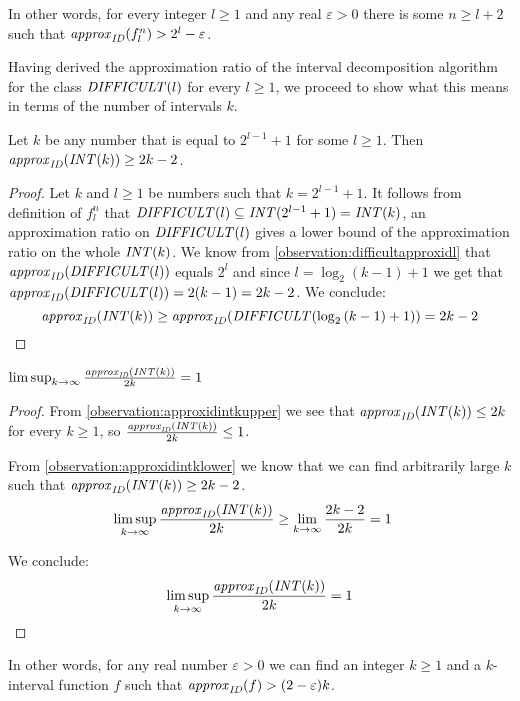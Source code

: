 In other words,
for every integer $l \geq 1$
and any real $\varepsilon > 0$
there is some $n \geq l+2$
such that $\mathit{approx}_{\mathit{ID}} (f_l^n) > 2^l - \varepsilon$.

Having derived the approximation ratio
of the interval decomposition algorithm
for the class $\mathit{DIFFICULT} (l)$ for every $l \geq 1$,
we proceed to show what this means in terms of
the number of intervals $k$.

\begin{observation}
\label{observation:approxidintklower}
Let $k$ be any number that is equal to $2^{l-1} + 1$
for some $l \geq 1$.
Then $\mathit{approx}_{\mathit{ID}} (\mathit{INT} (k)) \geq 2k-2$.
\end{observation}

\begin{proof}
Let $k$ and $l \geq 1$ be numbers
such that $k = 2^{l-1} + 1$.
It follows from definition of $f^n_l$ that
$\mathit{DIFFICULT} (l) \subseteq \mathit{INT} (2^{l-1}+1)
= \mathit{INT} (k)$,
an approximation ratio on $\mathit{DIFFICULT} (l)$
gives a lower bound of the approximation ratio
on the whole $\mathit{INT} (k)$.
We know from \cref{observation:difficultapproxidl} that
$\mathit{approx}_{\mathit{ID}} (\mathit{DIFFICULT} (l))$ equals $2^l$
and since $l = \log_2{(k-1)} + 1$ we get that
$\mathit{approx}_{\mathit{ID}} (\mathit{DIFFICULT} (l)) = 2(k-1) = 2k-2$.
We conclude:
$$
\mathit{approx}_{\mathit{ID}} (\mathit{INT} (k))
\geq \mathit{approx}_{\mathit{ID}} (\mathit{DIFFICULT} (\log_2{(k-1)} + 1))
= 2k-2
$$
\end{proof}

\begin{corollary}
$\limsup_{k \rightarrow \infty}{\frac{\mathit{approx}_{\mathit{ID}} (\mathit{INT} (k))}{2k}}
= 1$
\end{corollary}

\begin{proof}
From \cref{observation:approxidintkupper}
we see that $\mathit{approx}_{\mathit{ID}} (\mathit{INT} (k)) \leq 2k$
for every $k \geq 1$,
so $\frac{\mathit{approx}_{\mathit{ID}} (\mathit{INT} (k))}{2k} \leq 1$.

From \cref{observation:approxidintklower}
we know that we can find arbitrarily large $k$
such that $\mathit{approx}_{\mathit{ID}} (\mathit{INT} (k)) \geq 2k-2$.
\begin{align*}
\limsup_{k \rightarrow \infty}{\frac{\mathit{approx}_{\mathit{ID}} (\mathit{INT} (k))}{2k}}
&\geq \lim_{k \rightarrow \infty}{\frac{2k-2}{2k}} = 1
\end{align*}

We conclude:
$$
\limsup_{k \rightarrow \infty}{\frac{\mathit{approx}_{\mathit{ID}} (\mathit{INT} (k))}{2k}}
= 1
$$
\end{proof}

In other words,
for any real number $\varepsilon > 0$
we can find an integer $k \geq 1$
and a $k$-interval function $f$
such that $\mathit{approx}_{\mathit{ID}} (f) > (2-\varepsilon) k$.

